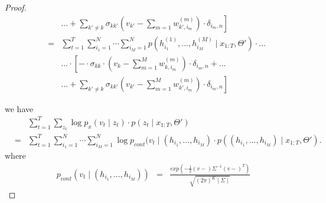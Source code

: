 \documentclass{amsart}
\begin{document}
\begin{proof}
\begin{eqnarray*}
&& \left....+\sum_{k'\neq k}\sigma_{kk'}\left(v_{k'}-\sum_{m=1}w_{k',i_m}^{(m)}\right)\cdot \delta_{i_m,n}\right]\\
& = & \sum_{t=1}^T\sum_{i_1=1}^N\cdots \sum_{i_M=1}^N  p(h_{i_1}^{(1)},...,h_{i_M}^{(M)}\mid x_{1:T},\Theta')\cdot...\\
&&...\cdot \left[-\cdot \sigma_{kk}\cdot \left(v_k-\sum_{m=1}^M w_{k,i_m}^{(m)}\right)\cdot \delta_{i_m,n}+...\right.\\
&& \left....+\sum_{k'\neq k}\sigma_{kk'}\left(v_{k'}-\sum_{m=1}^Mw_{k',i_m}^{(m)}\right)\cdot \delta_{i_m,n}\right]
\end{eqnarray*}




we have 
\begin{eqnarray*}
&&\sum_{t=1}^T\sum_{z_t}\log p_x(v_t\mid z_t)\cdot p(z_t\mid x_{1:T},\Theta')\\
& = &\sum_{t=1}^T\sum_{i_1=1}^N\cdots \sum_{i_M=1}^N\log p_{cont}(v_t\mid (h_{i_1},...,h_{i_M}) \cdot p((h_{i_1},...,h_{i_M})\mid x_{1:T},\Theta').
\end{eqnarray*}
where 
\begin{eqnarray*}
p_{cont}(v_t\mid (h_{i_1},...,h_{i_M})) & = & \frac{exp\left(-\frac{1}{2}(v- )\Sigma^{-1}(v-  )^T\right)}{\sqrt{(2\pi)^K \mid \Sigma\mid }}
\end{eqnarray*}
\end{proof}



\end{document}
